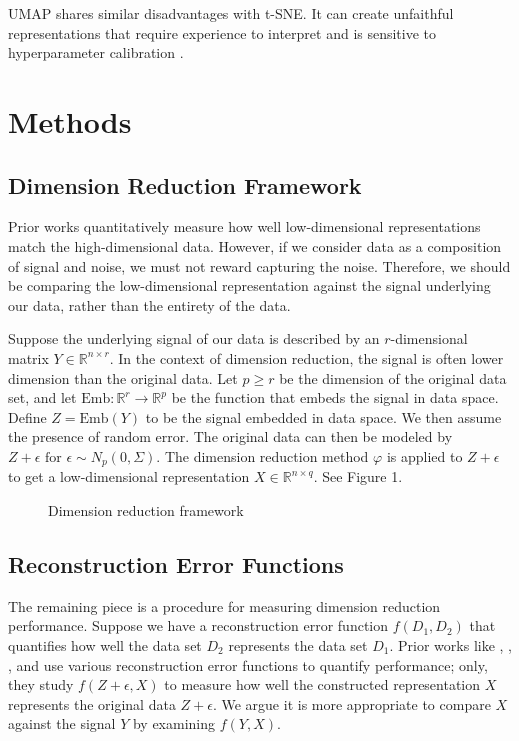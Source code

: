 \documentclass{article}
\begin{document}
UMAP shares similar disadvantages with t-SNE. It can create unfaithful representations that require experience to interpret and is sensitive to hyperparameter calibration \cite{understanding UMAP}.

\section{Methods}

\subsection{Dimension Reduction Framework}
Prior works quantitatively measure how well low-dimensional representations match the high-dimensional data. However, if we consider data as a composition of signal and noise, we must not reward capturing the noise. Therefore, we should be comparing the low-dimensional representation against the signal underlying our data, rather than the entirety of the data.

Suppose the underlying signal of our data is described by an $r$-dimensional matrix $Y \in \mathbb{R}^{n \times r}$. In the context of dimension reduction, the signal is often lower dimension than the original data. Let $p \geq r$ be the dimension of the original data set, and let $\textrm{Emb}:\mathbb{R}^r \to \mathbb{R}^p$ be the function that embeds the signal in data space. Define $Z = \textrm{Emb}(Y)$ to be the signal embedded in data space. We then assume the presence of random error. The original data can then be modeled by $Z + \epsilon \textrm{ for } \epsilon \sim N_p(0, \Sigma)$. The dimension reduction method $\varphi$ is applied to $Z + \epsilon$ to get a low-dimensional representation $X \in \mathbb{R}^{n \times q}$. See Figure 1.

\renewcommand{\thefigure}{1}
\begin{figure}[H]
\centering
\caption{Dimension reduction framework}
\end{figure}

\subsection{Reconstruction Error Functions}
The remaining piece is a procedure for measuring dimension reduction performance. Suppose we have a reconstruction error function $f(D_1, D_2)$ that quantifies how well the data set $D_2$ represents the data set $D_1$. Prior works like \cite{evaluation of DR transcriptomics}, \cite{t-SNE cell} , \cite{large DR unreliable}, and \cite{quantitative survey} use various reconstruction error functions to quantify performance; only, they study $f(Z + \epsilon, X)$ to measure how well the constructed representation $X$ represents the original data $Z + \epsilon$. We argue it is more appropriate to compare $X$ against the signal $Y$ by examining $f(Y, X)$.
\end{document}
